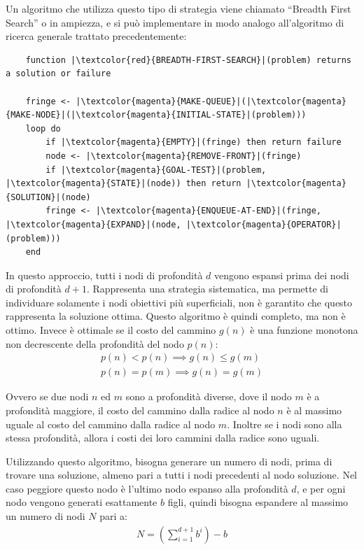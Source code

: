\documentclass{article}
\numberwithin{equation}{subsection}
\begin{document}
Un algoritmo che utilizza questo tipo di strategia viene chiamato ``Breadth First Search'' o 
in ampiezza, e si può implementare in modo analogo all'algoritmo di ricerca generale trattato 
precedentemente:
\begin{verbatim}
    function |\textcolor{red}{BREADTH-FIRST-SEARCH}|(problem) returns a solution or failure
    
    fringe <- |\textcolor{magenta}{MAKE-QUEUE}|(|\textcolor{magenta}{MAKE-NODE}|(|\textcolor{magenta}{INITIAL-STATE}|(problem)))
    loop do
        if |\textcolor{magenta}{EMPTY}|(fringe) then return failure
        node <- |\textcolor{magenta}{REMOVE-FRONT}|(fringe)
        if |\textcolor{magenta}{GOAL-TEST}|(problem, |\textcolor{magenta}{STATE}|(node)) then return |\textcolor{magenta}{SOLUTION}|(node)
        fringe <- |\textcolor{magenta}{ENQUEUE-AT-END}|(fringe, |\textcolor{magenta}{EXPAND}|(node, |\textcolor{magenta}{OPERATOR}|(problem)))
    end
\end{verbatim}

In questo approccio, tutti i nodi di profondità $d$ vengono espansi prima dei nodi di profondità 
$d+1$. Rappresenta una strategia sistematica, ma permette di individuare solamente i nodi 
obiettivi più superficiali, non è garantito che questo rappresenta la soluzione ottima. Questo 
algoritmo è quindi completo, ma non è ottimo. 
Invece è ottimale se il costo del cammino $g(n)$ è una funzione monotona non decrescente della 
profondità del nodo $p(n)$:
\begin{gather*}
    p(n)<p(n)\implies g(n)\leq g(m)\\
    p(n)=p(m)\implies g(n)=g(m)
\end{gather*} 

Ovvero se due nodi $n$ ed $m$ sono a profondità diverse, dove il nodo $m$ è a profondità maggiore, 
il costo del cammino dalla radice al nodo $n$ è al massimo uguale al costo del cammino dalla radice 
al nodo $m$. Inoltre se i nodi sono alla stessa profondità, allora i costi dei loro cammini dalla radice 
sono uguali. 


Utilizzando questo algoritmo, bisogna generare un numero di nodi, prima di trovare una soluzione,  
almeno pari a tutti i nodi precedenti al nodo soluzione. Nel caso peggiore questo nodo è 
l'ultimo nodo espanso alla profondità $d$, e per ogni nodo vengono generati esattamente $b$ 
figli, quindi bisogna espandere al massimo un numero di nodi $N$ pari a:
\begin{gather*}
    N=\left(\displaystyle\sum_{i=1}^{d+1}b^i\right)-b
\end{gather*}
\end{document}
